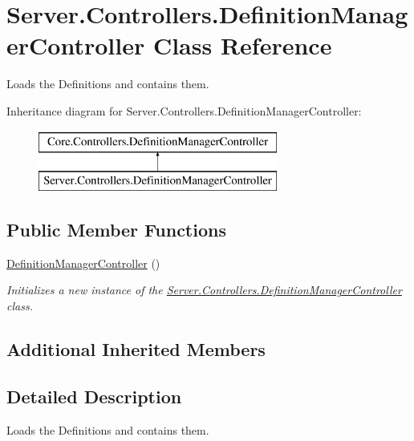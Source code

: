 \hypertarget{classServer_1_1Controllers_1_1DefinitionManagerController}{}\section{Server.\+Controllers.\+Definition\+Manager\+Controller Class Reference}
\label{classServer_1_1Controllers_1_1DefinitionManagerController}


Loads the Definitions and contains them.  


Inheritance diagram for Server.\+Controllers.\+Definition\+Manager\+Controller\+:\begin{figure}[H]
\begin{center}
\leavevmode
\includegraphics[height=2.000000cm]{classServer_1_1Controllers_1_1DefinitionManagerController}
\end{center}
\end{figure}
\subsection*{Public Member Functions}
\begin{DoxyCompactItemize}
\item 
\hyperlink{classServer_1_1Controllers_1_1DefinitionManagerController_afc57fe6b2fb92f1f45d106e4bd7853b5}{Definition\+Manager\+Controller} ()
\begin{DoxyCompactList}\small\item\em Initializes a new instance of the \hyperlink{classServer_1_1Controllers_1_1DefinitionManagerController}{Server.\+Controllers.\+Definition\+Manager\+Controller} class. \end{DoxyCompactList}\end{DoxyCompactItemize}
\subsection*{Additional Inherited Members}


\subsection{Detailed Description}
Loads the Definitions and contains them. 



